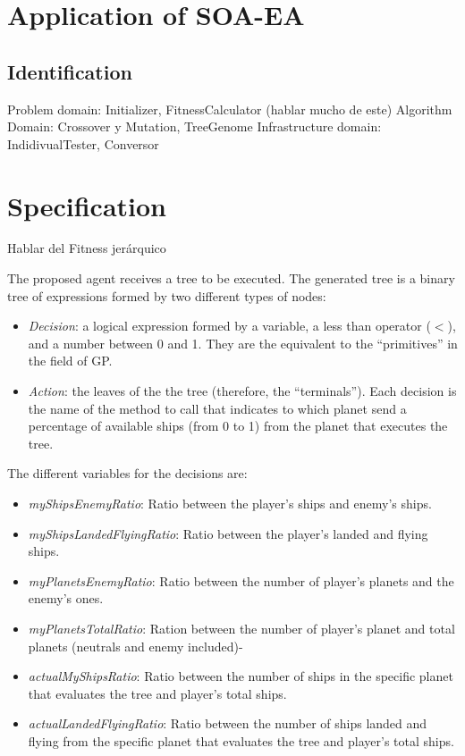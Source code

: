 \section{Application of SOA-EA}

\subsection{Identification}

Problem domain: Initializer, FitnessCalculator (hablar mucho de este)
Algorithm Domain: Crossover y Mutation, TreeGenome 
Infrastructure domain: IndidivualTester, Conversor

\section{Specification}
Hablar del Fitness jerárquico

The proposed agent receives a tree to be executed. The generated tree
is a binary tree of expressions formed by two different types of nodes:

\begin{itemize}
\item {\em Decision}: a logical expression formed by a variable, a less than operator ($<$), and a number between 0 and 1. They are the equivalent to the ``primitives'' in the field of GP.
\item {\em Action}: the leaves of the the tree (therefore, the ``terminals''). Each decision is the name of the method to call that indicates to which planet send a percentage of available ships (from 0 to 1) from the planet that executes the tree. 
\end{itemize}

The different variables for the decisions are:

\begin{itemize}
\item {\em myShipsEnemyRatio}: Ratio between the player's ships and enemy's ships.
\item {\em myShipsLandedFlyingRatio}: Ratio between the player's landed and flying ships.
\item {\em myPlanetsEnemyRatio}: Ratio between the number of player's planets and the enemy's ones.
\item {\em myPlanetsTotalRatio}: Ration between the number of player's planet and total planets (neutrals and enemy included)-
\item {\em actualMyShipsRatio}: Ratio between the number of ships in the specific planet that evaluates the tree and player's total ships.
\item {\em actualLandedFlyingRatio}: Ratio between the number of ships landed and flying from the specific planet that evaluates the tree and player's total ships.
\end{itemize}

